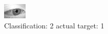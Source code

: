 \begin{figure}[h!]
\begin{center}
\includegraphics[width=0.60\columnwidth]{figures/ID2733_class_2_target_1.png}
\end{center}
\caption{ Classification: 2 actual target: 1}
\label{fig:ID2733_class_2_target_1}
\end{figure}
